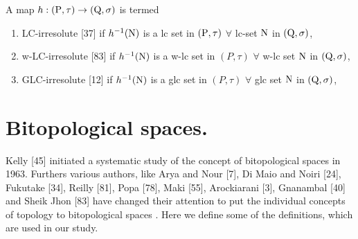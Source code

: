 \begin{dfn}\label{dfn1.5.3} 
A map $h: (\mathrm{P}, \tau)\rightarrow (\mathrm{Q}, \sigma)$ is termed
\begin{enumerate}[\rm (i)]
\item LC-irresolute [37] if $h^{-1}(\mathrm{N})$ is a lc set in $(\mathrm{P},\tau)$ $\forall$  lc-set $\mathrm{N}$ in $(\mathrm{Q}, \sigma)$,
\item w-LC-irresolute [83] if $h^{-1}(\mathrm{N})$ is a w-lc set in $(P,\tau)$ $\forall$ w-lc set $\mathrm{N}$ in $(\mathrm{Q}, \sigma)$,
\item GLC-irresolute [12] if $h^{-1}(\mathrm{N})$ is a glc set in $(P,\tau)$ $\forall$ glc set $\mathrm{N}$ in $(\mathrm{Q}, \sigma)$,
\end{enumerate}
\end{dfn}

\section{Bitopological spaces.}

Kelly [45] initiated a systematic study of the concept of bitopological spaces in 1963. Furthers various authors, like Arya and Nour [7], Di Maio and Noiri [24], Fukutake [34], Reilly [81], Popa [78], Maki [55], Arockiarani [3], Gnanambal [40] and Sheik Jhon [83] have changed their attention to  put the individual  concepts  of topology to  bitopological spaces . Here we define some of the definitions, which are used in our study. 

